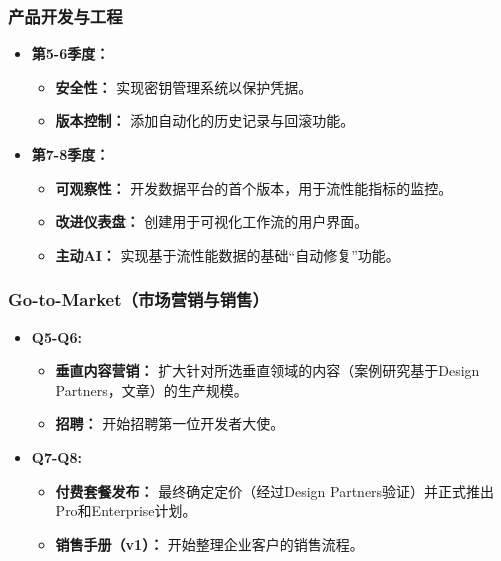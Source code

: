 \documentclass[11点, A4纸, 单面]{article}
\begin{document}
\subsubsection{产品开发与工程}
\begin{itemize}[leftmargin=*]
    \item \textbf{第5-6季度：}
    \begin{itemize}
        \item \textbf{安全性：} 实现密钥管理系统以保护凭据。
        \item \textbf{版本控制：} 添加自动化的历史记录与回滚功能。
    \end{itemize}
    \item \textbf{第7-8季度：}
    \begin{itemize}
        \item \textbf{可观察性：} 开发数据平台的首个版本，用于流性能指标的监控。
        \item \textbf{改进仪表盘：} 创建用于可视化工作流的用户界面。
        \item \textbf{主动AI：} 实现基于流性能数据的基础“自动修复”功能。



\end{itemize}
\end{itemize}

\subsubsection{Go-to-Market（市场营销与销售）}
\begin{itemize}[leftmargin=*]
    \item \textbf{Q5-Q6:}
    \begin{itemize}
        \item \textbf{垂直内容营销：} 扩大针对所选垂直领域的内容（案例研究基于Design Partners，文章）的生产规模。
        \item \textbf{招聘：} 开始招聘第一位开发者大使。
    \end{itemize}
    \item \textbf{Q7-Q8:}
    \begin{itemize}
        \item \textbf{付费套餐发布：} 最终确定定价（经过Design Partners验证）并正式推出Pro和Enterprise计划。
        \item \textbf{销售手册（v1）：} 开始整理企业客户的销售流程。
    \end{itemize}
\end{itemize}
\end{document}
